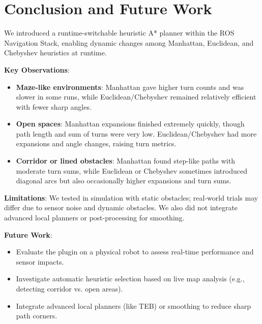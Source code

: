 \documentclass[letterpaper, 10 pt, conference]{ieeeconf}
\begin{document}
\section{Conclusion and Future Work}\label{sec:conclusion}
We introduced a runtime-switchable heuristic A* planner within the ROS Navigation Stack, enabling dynamic changes among Manhattan, Euclidean, and Chebyshev heuristics at runtime. 

\textbf{Key Observations}:
\begin{itemize}
    \item \textbf{Maze-like environments}: Manhattan gave higher turn counts and was slower 
    in some runs, while Euclidean/Chebyshev remained relatively efficient with fewer sharp angles.
    \item \textbf{Open spaces}: Manhattan expansions finished extremely quickly, though path length 
    and sum of turns were very low. Euclidean/Chebyshev had more expansions and angle changes, raising turn metrics.
    \item \textbf{Corridor or lined obstacles}: Manhattan found step-like paths with moderate turn sums, 
    while Euclidean or Chebyshev sometimes introduced diagonal arcs but also occasionally higher expansions and turn sums.
\end{itemize}

\textbf{Limitations}: We tested in simulation with static obstacles; real-world trials may differ due to sensor noise and dynamic obstacles. We also did not integrate 
advanced local planners or post-processing for smoothing.  

\textbf{Future Work}: 
\begin{itemize}
    \item Evaluate the plugin on a physical robot to assess real-time performance and sensor impacts.
    \item Investigate automatic heuristic selection based on live map analysis (e.g., detecting corridor vs. open areas).
    \item Integrate advanced local planners (like TEB) or smoothing to reduce sharp path corners.
\end{itemize}


% 
\end{document}
